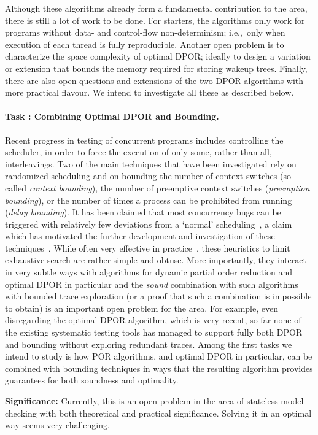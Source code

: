 \documentclass[11pt]{article}
\newcounter{Task}
\newcommand{\task}[1]{\addtocounter{Task}{1}\paragraph{Task \theTask: #1}}
\newcommand{\significance}[1]{\vspace*{-0.5em}%
  \begin{quoting}\noindent\textbf{Significance:} #1\end{quoting}}
\newcommand{\myparagraph}{}
\let\myparagraph=\paragraph
\renewcommand{\paragraph}{\vspace{-3mm}\myparagraph}
\newcommand{\ie}{i.\/e.,\ }
\begin{document}
{Although these algorithms already form a fundamental contribution to
the area, there is still a lot of work to be done.  For starters, the
algorithms only work for programs without data- and control-flow
non-determinism; \ie only when execution of each thread is fully reproducible.
Another open problem is to characterize the space complexity of
optimal DPOR; ideally to design a variation or extension that bounds
the memory required for storing wakeup trees.  Finally, there are also
open questions and extensions of the two DPOR algorithms with more
practical flavour.  We intend to investigate all these as described
below.

\task{Combining Optimal DPOR and Bounding.}
Recent progress in testing of concurrent programs includes controlling
the scheduler, in order to force the execution of only some, rather than
all, interleavings. Two of the main techniques that have been investigated
rely on randomized scheduling and on bounding the number of context-switches
(so called \emph{context bounding}), the number of preemptive context
switches (\emph{preemption bounding}), or the number of times a process
can be prohibited from running (\emph{delay bounding}). It has been
claimed that most concurrency bugs can be triggered with relatively
few deviations from a `normal' scheduling~\cite{Randomized@ASPLOS-10},
a claim which has motivated the further development and investigation
of these techniques~\cite{ScheduleBounding@PPoPP-14}.
%
While often very effective in
practice~\cite{BPOR@OOPSLA-13,ScheduleBounding@PPoPP-14}, these heuristics
to limit exhaustive search are rather simple and obtuse.  More importantly,
they interact in very subtle ways with algorithms for dynamic partial order
reduction and optimal DPOR in particular and the \emph{sound} combination
with such algorithms with bounded trace exploration (or a proof that such a
combination is impossible to obtain) is an important open problem for the
area.  For example, even disregarding the optimal DPOR algorithm, which is
very recent, so far none of the existing systematic testing tools has managed
to support fully both DPOR and bounding without exploring redundant traces.
%
Among the first tasks we intend to study is how POR algorithms, and
optimal DPOR in particular, can be combined with bounding techniques
in ways that the resulting algorithm provides guarantees for
both soundness and optimality.

\significance{Currently, this is an open problem in the area of stateless
  model checking with both theoretical and practical significance. Solving
  it in an optimal way seems very challenging.}

}
\end{document}
